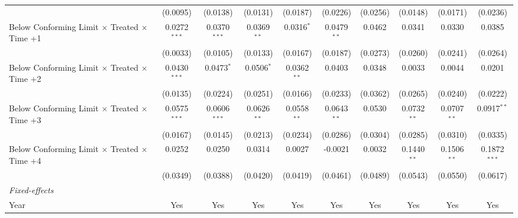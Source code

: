 \begin{tabular}{lccccccccc}
                                                              & (0.0095)               & (0.0138)       & (0.0131)      & (0.0187)      & (0.0226)       & (0.0256)      & (0.0148)      & (0.0171)      & (0.0236)\\   
   Below Conforming Limit $\times$ Treated $\times$ Time +1   & 0.0272$^{***}$         & 0.0370$^{***}$ & 0.0369$^{**}$ & 0.0316$^{*}$  & 0.0479$^{**}$  & 0.0462        & 0.0341        & 0.0330        & 0.0385\\   
                                                              & (0.0033)               & (0.0105)       & (0.0133)      & (0.0167)      & (0.0187)       & (0.0273)      & (0.0260)      & (0.0241)      & (0.0264)\\   
   Below Conforming Limit $\times$ Treated $\times$ Time +2   & 0.0430$^{***}$         & 0.0473$^{*}$   & 0.0506$^{*}$  & 0.0362$^{**}$ & 0.0403         & 0.0348        & 0.0033        & 0.0044        & 0.0201\\   
                                                              & (0.0135)               & (0.0224)       & (0.0251)      & (0.0166)      & (0.0233)       & (0.0362)      & (0.0265)      & (0.0240)      & (0.0222)\\   
   Below Conforming Limit $\times$ Treated $\times$ Time +3   & 0.0575$^{***}$         & 0.0606$^{***}$ & 0.0626$^{**}$ & 0.0558$^{**}$ & 0.0643$^{**}$  & 0.0530        & 0.0732$^{**}$ & 0.0707$^{**}$ & 0.0917$^{**}$\\   
                                                              & (0.0167)               & (0.0145)       & (0.0213)      & (0.0234)      & (0.0286)       & (0.0304)      & (0.0285)      & (0.0310)      & (0.0335)\\   
   Below Conforming Limit $\times$ Treated $\times$ Time +4   & 0.0252                 & 0.0250         & 0.0314        & 0.0027        & -0.0021        & 0.0032        & 0.1440$^{**}$ & 0.1506$^{**}$ & 0.1872$^{***}$\\   
                                                              & (0.0349)               & (0.0388)       & (0.0420)      & (0.0419)      & (0.0461)       & (0.0489)      & (0.0543)      & (0.0550)      & (0.0617)\\   
   \midrule
   \emph{Fixed-effects}\\
   Year                                                       & Yes                    & Yes            & Yes           & Yes           & Yes            & Yes           & Yes           & Yes           & Yes\\  

\end{tabular}
